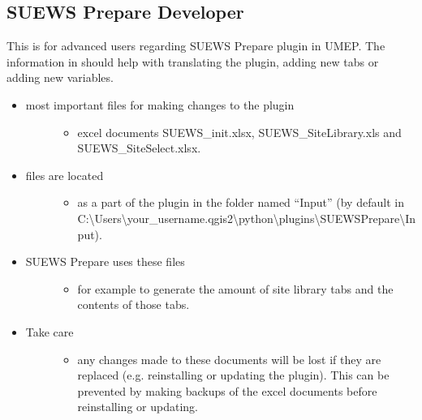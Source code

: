\documentclass[letterpaper,10pt,english]{sphinxmanual}
\begin{document}
\subsection{SUEWS Prepare Developer}
\label{\detokenize{DevelopmentGuidelines:suews-prepare-developer}}
This is for advanced users regarding SUEWS Prepare plugin in UMEP. The
information in should help with translating the plugin, adding new tabs
or adding new variables.
\begin{itemize}
\item {} \begin{description}
\item[{most important files for making changes to the plugin}] \leavevmode\begin{itemize}
\item {} 
excel documents SUEWS\_init.xlsx, SUEWS\_SiteLibrary.xls and SUEWS\_SiteSelect.xlsx.

\end{itemize}

\end{description}

\item {} \begin{description}
\item[{files are located}] \leavevmode\begin{itemize}
\item {} 
as a part of the plugin in the folder named “Input” (by default in C:\textbackslash{}Users\textbackslash{}your\_username.qgis2\textbackslash{}python\textbackslash{}plugins\textbackslash{}SUEWSPrepare\textbackslash{}Input).

\end{itemize}

\end{description}

\item {} \begin{description}
\item[{SUEWS Prepare uses these files}] \leavevmode\begin{itemize}
\item {} 
for example to generate the amount of site library tabs and the contents of those tabs.

\end{itemize}

\end{description}

\item {} \begin{description}
\item[{Take care}] \leavevmode\begin{itemize}
\item {} 
any changes made to these documents will be lost if they are replaced (e.g. reinstalling or updating the plugin). This can be prevented by making backups of the excel documents before reinstalling or updating.


\end{itemize}
\end{description}
\end{itemize}
\end{document}
